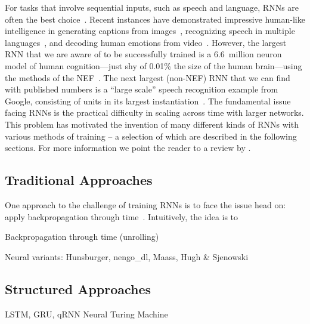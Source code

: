 For tasks that involve sequential inputs, such as speech and language, RNNs are often the best choice~\citep{lecun2015deep}.
Recent instances have demonstrated impressive human-like intelligence in generating captions from images~\citep{vinyals2015show}, recognizing speech in multiple languages~\citep{amodei2016deep}, and decoding human emotions from video~\citep{ebrahimi2015recurrent}.
However, the largest RNN that we are aware of to be successfully trained is a 6.6~million neuron model of human cognition---just shy of 0.01\% the size of the human brain---using the methods of the NEF~\citep{choo2018}.
The next largest (non-NEF) RNN that we can find with published numbers is a ``large scale'' speech recognition example from Google, consisting of  units in its largest instantiation~\citep[][Table~1]{sak2014long}.
The fundamental issue facing RNNs is the practical difficulty in scaling across time with larger networks.
This problem has motivated the invention of many different kinds of RNNs with various methods of training -- a selection of which are described in the following sections.
For more information we point the reader to a review by \citet{salehinejad2017recent}.

\citep{pascanu2013difficulty}

\subsection{Traditional Approaches}

One approach to the challenge of training RNNs is to face the issue head on: apply backpropagation through time~\citep[BPTT;][]{werbos1990backpropagation}.
Intuitively, the idea is to 

Backpropagation through time (unrolling)

Neural variants: Hunsburger, nengo\_dl, Maass, Hugh \& Sjenowski

\subsection{Structured Approaches}

LSTM, GRU, qRNN
Neural Turing Machine


